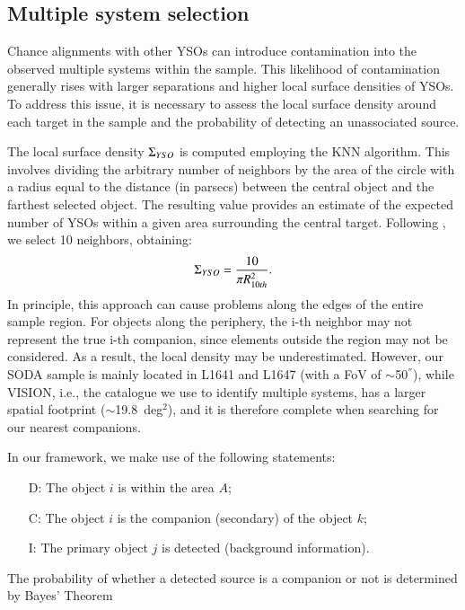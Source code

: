 \documentclass{aa}
\begin{document}
\subsection{Multiple system selection} \label{section2.3}

Chance alignments with other YSOs can introduce contamination into the observed multiple systems within the sample. This likelihood of contamination generally rises with larger separations and higher local surface densities of YSOs. To address this issue, it is necessary to assess the local surface density around each target in the sample and the probability of detecting an unassociated source. \par
The local surface density $\Sigma_{\small{YSO}}$ is computed employing the KNN algorithm. This involves dividing the arbitrary number of neighbors by the area of the circle with a radius equal to the distance (in parsecs) between the central object and the farthest selected object. The resulting value provides an estimate of the expected number of YSOs within a given area surrounding the central target. Following \cite{Megeath16}, we select 10 neighbors, obtaining:
\begin{equation}
    \Sigma_{\small{YSO}} = \frac{10}{\pi R_{10th}^2}.
\end{equation}
In principle, this approach can cause problems along the edges of the entire sample region. For objects along the periphery, the i-th neighbor may not represent the true i-th companion, since elements outside the region may not be considered. As a result, the local density may be underestimated. However, our SODA sample is mainly located in L1641 and L1647 (with a FoV of $\sim$50$^{''}$), while VISION, i.e., the catalogue we use to identify multiple systems, has a larger spatial footprint ($\sim$19.8~deg$^2$), and it is therefore complete when searching for our nearest companions. \par
In our framework, we make use of the following statements:
\begin{itemize}
    \item [D:] The object $i$ is within the area $A$;
    \item [C:] The object $i$ is the companion (secondary) of the object $k$;
    \item [I:] The primary object $j$ is detected (background information).
\end{itemize}
\par
The probability of whether a detected source is a companion or not is determined by Bayes' Theorem
\end{document}
